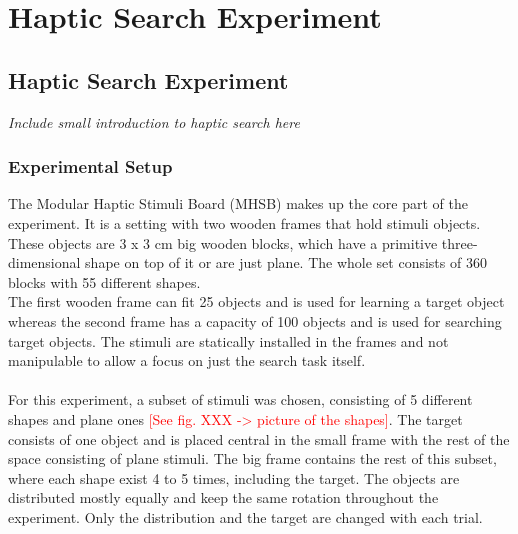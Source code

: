 
\chapter{Haptic Search Experiment} %

\label{Haptic Search Experiment} %


\section{Haptic Search Experiment}
\textit{Include small introduction to haptic search here}

\subsection{Experimental Setup}
The Modular Haptic Stimuli Board (MHSB) makes up the core part of the experiment. It is a setting with two wooden frames that hold stimuli objects. These objects are 3 x 3 cm big wooden blocks, which have a primitive three-dimensional shape on top of it or are just plane. The whole set consists of 360 blocks with 55 different shapes.\\
The first wooden frame can fit 25 objects and is used for learning a target object whereas the second frame has a capacity of 100 objects and is used for searching target objects. The stimuli are statically installed in the frames and not manipulable to allow a focus on just the search task itself.\\
\\
For this experiment, a subset of stimuli was chosen, consisting of 5 different shapes and plane ones \textcolor{red}{[See fig. XXX -> picture of the shapes]}. The target consists of one object and is placed central in the small frame with the rest of the space consisting of plane stimuli. The big frame contains the rest of this subset, where each shape exist 4 to 5 times, including the target. The objects are distributed mostly equally and keep the same rotation throughout the experiment. Only the distribution and the target are changed with each trial.

